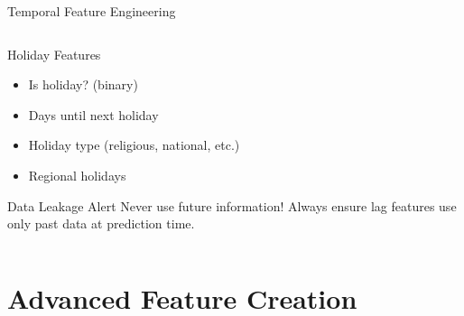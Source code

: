 \documentclass[aspectratio=169,11pt]{beamer}
\begin{document}
\begin{frame}[fragile]{Temporal Feature Engineering}
\begin{columns}
\begin{column}{0.45\textwidth}
\vspace{0.3cm}
\begin{block}{Holiday Features}
\begin{itemize}
\item Is holiday? (binary)
\item Days until next holiday
\item Holiday type (religious, national, etc.)
\item Regional holidays
\end{itemize}
\end{block}

\begin{alertblock}{Data Leakage Alert}
Never use future information! Always ensure lag features use only past data at prediction time.
\end{alertblock}
\end{column}
\end{columns}
\end{frame}

\section{Advanced Feature Creation}
\end{document}
